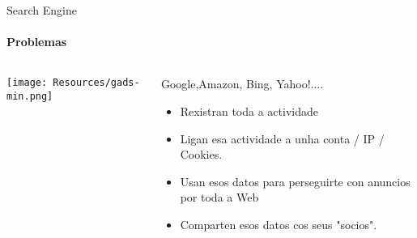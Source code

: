 \documentclass{beamer}
\begin{document}
\begin{frame}{Search Engine}
  \framesubtitle{Problemas}

  \begin{columns}
    \begin{column}{0.5\textwidth}
      \texttt{[image: Resources/gads-min.png]}

    \end{column}

    \begin{column}{0.5\textwidth}
      \begin{block}{Google,Amazon, Bing, Yahoo!....}
        \begin{itemize}
          \item Rexistran toda a actividade
          \item Ligan esa actividade a unha conta / IP / Cookies.
          \item Usan esos datos para perseguirte con anuncios por toda a Web
          \item Comparten esos datos cos seus "socios".
        \end{itemize}
      \end{block}

    \end{column}

  \end{columns}

\end{frame}

\end{document}
